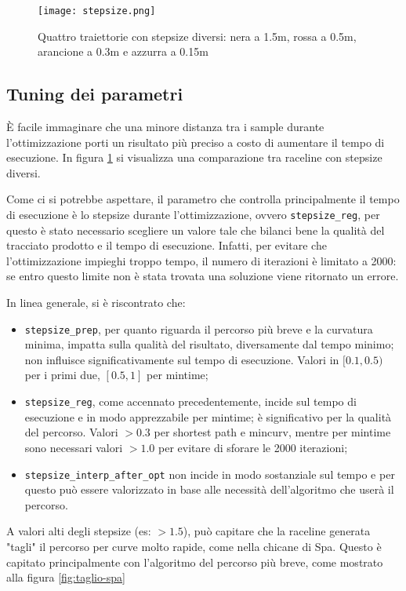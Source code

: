 \begin{figure}[h]
	\begin{center}
		\texttt{[image: stepsize.png]}
	\end{center}
	\caption{Quattro traiettorie con stepsize diversi: nera a 1.5m, rossa a 0.5m,
	arancione a 0.3m e azzurra a 0.15m}
	\label{fig:stepsize}
\end{figure}

\subsection{Tuning dei parametri}
\label{par:tuning}
È facile immaginare che una minore distanza tra i sample durante l'ottimizzazione porti un risultato
più preciso a costo di aumentare il tempo di esecuzione. %
In figura \ref{fig:stepsize} si visualizza una comparazione tra raceline con stepsize diversi.

Come ci si potrebbe aspettare, il parametro che controlla principalmente il tempo di esecuzione è lo
stepsize durante l'ottimizzazione, ovvero \verb|stepsize_reg|, per questo è stato necessario scegliere un
valore tale che bilanci bene la qualità del tracciato prodotto e il tempo di esecuzione. Infatti, per
evitare che l'ottimizzazione impieghi troppo tempo, il numero di iterazioni è limitato a 2000: se entro
questo limite non è stata trovata una soluzione viene ritornato un errore.

In linea generale, si è riscontrato che:
\begin{itemize}
	\item \verb|stepsize_prep|, per quanto riguarda il percorso più breve e la curvatura minima, impatta
		sulla qualità del risultato, diversamente dal tempo minimo; non influisce significativamente sul
		tempo di esecuzione. Valori in $[0.1, 0.5)$ per i primi due, $[0.5, 1]$ per mintime;
	\item \verb|stepsize_reg|, come accennato precedentemente, incide sul tempo di esecuzione
		e in modo apprezzabile per mintime; è significativo per la qualità del percorso. Valori $ > 0.3$
		per shortest path e mincurv, mentre per mintime sono necessari valori $> 1.0$ per evitare di
		sforare le 2000 iterazioni;
	\item \verb|stepsize_interp_after_opt| non incide in modo sostanziale sul tempo e per questo può
		essere valorizzato in base alle necessità dell'algoritmo che userà il percorso.
\end{itemize}
A valori alti degli stepsize (es: $> 1.5$), può capitare che la raceline generata "tagli" il percorso per
curve molto rapide, come nella chicane di Spa. Questo è capitato principalmente con l'algoritmo del
percorso più breve, come mostrato alla figura \ref{fig:taglio-spa}

